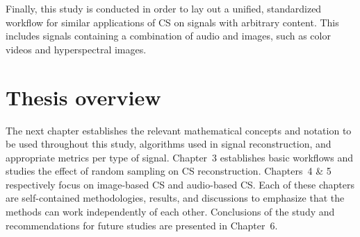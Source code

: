 Finally, this study is conducted in order to lay out a unified, standardized workflow for similar applications of CS on signals with arbitrary content. This includes signals containing a combination of audio and images, such as color videos and hyperspectral images.


\section{Thesis overview}
\label{sec:overview}
The next chapter establishes the relevant mathematical concepts and notation to be used throughout this study, algorithms used in signal reconstruction, and appropriate metrics per type of signal. Chapter~3 establishes basic workflows and studies the effect of random sampling on CS reconstruction. Chapters~4 \& 5 respectively focus on image-based CS and audio-based CS. Each of these chapters are self-contained methodologies, results, and discussions to emphasize that the methods can work independently of each other. Conclusions of the study and recommendations for future studies are presented in Chapter~6.